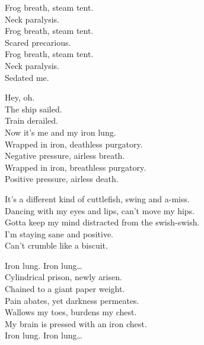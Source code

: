 Frog breath, steam tent. \\
Neck paralysis. \\
Frog breath, steam tent. \\
Scared precarious. \\
Frog breath, steam tent. \\
Neck paralysis. \\
Sedated me. \\


Hey, oh. \\
The ship sailed. \\
Train derailed. \\
Now it's me and my iron lung. \\

Wrapped in iron, deathless purgatory. \\
Negative pressure, airless breath. \\
Wrapped in iron, breathless purgatory. \\
Positive pressure, airless death. \\


It's a different kind of cuttlefish, swing and a-miss. \\
Dancing with my eyes and lips, can't move my hips. \\
Gotta keep my mind distracted from the swish-swish. \\
I'm staying sane and positive. \\
Can't crumble like a biscuit. \\


Iron lung. Iron lung… \\

Cylindrical prison, newly arisen. \\
Chained to a giant paper weight. \\
Pain abates, yet darkness permeates. \\
Wallows my toes, burdens my chest. \\
My brain is pressed with an iron chest. \\

Iron lung. Iron lung… \\



